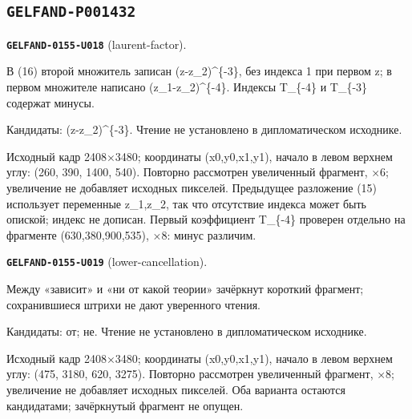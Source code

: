 \subsection*{\texttt{GELFAND-P001432}}
\par\noindent\leavevmode{}\label{GELFAND-0155-U018}\label{GELFAND-P001432:laurent-factor}\textbf{\texttt{GELFAND-0155-U018}} (laurent-factor).\nopagebreak[4]\par
В (16) второй множитель записан (z-z\_2)\textasciicircum{}\{-3\}, без индекса 1 при первом z; в первом множителе написано (z\_1-z\_2)\textasciicircum{}\{-4\}. Индексы T\_\{-4\} и T\_\{-3\} содержат минусы.\par
Кандидаты: (z-z\_2)\textasciicircum{}\{-3\}. Чтение не установлено в дипломатическом исходнике.\par
Исходный кадр 2408×3480; координаты (x0,y0,x1,y1), начало в левом верхнем углу: (260, 390, 1400, 540). Повторно рассмотрен увеличенный фрагмент, ×6; увеличение не добавляет исходных пикселей. Предыдущее разложение (15) использует переменные z\_1,z\_2, так что отсутствие индекса может быть опиской; индекс не дописан. Первый коэффициент T\_\{-4\} проверен отдельно на фрагменте (630,380,900,535), ×8: минус различим.\par
\medskip
\par\noindent\leavevmode{}\label{GELFAND-0155-U019}\label{GELFAND-P001432:lower-cancellation}\textbf{\texttt{GELFAND-0155-U019}} (lower-cancellation).\nopagebreak[4]\par
Между «зависит» и «ни от какой теории» зачёркнут короткий фрагмент; сохранившиеся штрихи не дают уверенного чтения.\par
Кандидаты: от; не. Чтение не установлено в дипломатическом исходнике.\par
Исходный кадр 2408×3480; координаты (x0,y0,x1,y1), начало в левом верхнем углу: (475, 3180, 620, 3275). Повторно рассмотрен увеличенный фрагмент, ×8; увеличение не добавляет исходных пикселей. Оба варианта остаются кандидатами; зачёркнутый фрагмент не опущен.\par
\medskip
